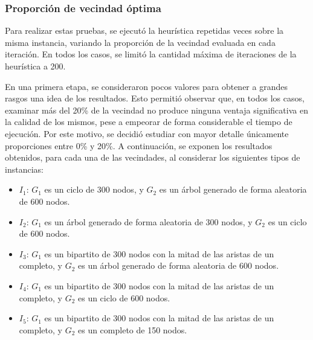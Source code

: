 \subsubsection{Proporción de vecindad óptima}
Para realizar estas pruebas, se ejecutó la heurística repetidas veces sobre
la misma instancia, variando la proporción de la vecindad evaluada en cada
iteración. En todos los casos, se limitó la cantidad máxima de iteraciones
de la heurística a 200.

En una primera etapa, se consideraron pocos valores para obtener a grandes
rasgos una idea de los resultados. Esto permitió observar que, en todos los
casos, examinar más del 20\% de la vecindad no produce ninguna ventaja
significativa en la calidad de los mismos, pese a empeorar de forma
considerable el tiempo de ejecución. Por este motivo, se decidió estudiar con
mayor detalle únicamente proporciones entre 0\% y 20\%. A continuación, se
exponen los resultados obtenidos, para cada una de las vecindades, al
considerar los siguientes tipos de instancias:

\begin{itemize}
    \item $I_1$: $G_1$ es un ciclo de 300 nodos, y $G_2$ es un árbol generado
    de forma aleatoria de 600 nodos.
    \item $I_2$: $G_1$ es un árbol generado de forma aleatoria de 300 nodos, y
    $G_2$ es un ciclo de 600 nodos.
    \item $I_3$: $G_1$ es un bipartito de 300 nodos con la mitad de las
    aristas de un completo, y $G_2$ es un árbol generado de forma aleatoria de
    600 nodos.
    \item $I_4$: $G_1$ es un bipartito de 300 nodos con la mitad de las
    aristas de un completo, y $G_2$ es un ciclo de 600 nodos.
    \item $I_5$: $G_1$ es un bipartito de 300 nodos con la mitad de las
    aristas de un completo, y $G_2$ es un completo de 150 nodos.
\end{itemize}


